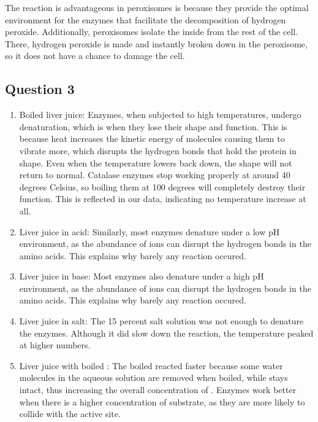 \documentclass[12pt]{article}
\begin{document}
\begin{enumAlph}
    \item The reaction is advantageous in peroxisomes is because they provide
    the optimal environment for the enzymes that 
    facilitate the decomposition of hydrogen peroxide. Additionally, peroxisomes isolate 
    the inside from the rest of the cell. There, hydrogen peroxide is
    made and instantly broken down in the peroxisome, so it does not have a chance to
    damage the cell.

\end{enumAlph}

\subsection*{Question 3}
\begin{enumAlph}
    \item 
    
    \begin{enumerate}[label=\arabic*.]
        \item Boiled liver juice: Enzymes, when subjected to 
        high temperatures, undergo denaturation, which is
        when they lose their shape and function. This is because heat increases the kinetic energy of molecules
        causing them to vibrate more, which disrupts the hydrogen bonds that
        hold the protein in shape. Even when the temperature lowers back down, 
        the shape will not return to normal. Catalase enzymes stop working properly at
        around 40 degrees Celsius, so boiling them at 100 degrees will completely
        destroy their function. This is reflected in our data, indicating no 
        temperature increase at all. 
        
        \item Liver juice in acid: Similarly, most enzymes denature under
        a low pH environment, as the abundance of  ions can disrupt
        the hydrogen bonds in the amino acids. This explains why barely any reaction
        occured. 

        \item Liver juice in base: Most enzymes also denature under
        a high pH environment, as the abundance of  ions can disrupt
        the hydrogen bonds in the amino acids. This explains why barely any reaction
        occured. 

        \item Liver juice in salt: The 15 percent salt solution was not enough to denature the 
        enzymes. Although it did slow down the reaction, the temperature peaked at 
        higher numbers. 

        \item Liver juice with boiled : The boiled  reacted faster because 
        some water molecules in the aqueous solution are removed when boiled, while 
         stays intact, thus
        increasing the overall concentration of . Enzymes work better when 
        there is a higher concentration of substrate, as they are more likely to collide
        with the active site.

        
    \end{enumerate}
\end{enumAlph}
\end{document}
